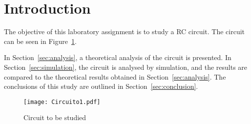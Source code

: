 \section{Introduction}
\label{sec:introduction}

The objective of this laboratory assignment is to study a RC circuit. The circuit can be seen in Figure~\ref{fig:circuit}.


In Section~\ref{sec:analysis}, a theoretical analysis of the circuit is
presented. In Section~\ref{sec:simulation}, the circuit is analysed by
simulation, and the results are compared to the theoretical results obtained in
Section~\ref{sec:analysis}. The conclusions of this study are outlined in
Section~\ref{sec:conclusion}.

\begin{figure}[H] \centering
\texttt{[image: Circuito1.pdf]}
\caption{Circuit to be studied}
\label{fig:circuit}
\end{figure}


